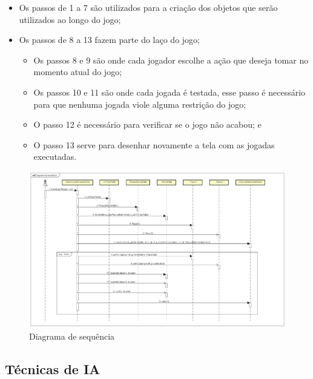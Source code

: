 \begin{itemize}
	\item Os passos de 1 a 7 são utilizados para a criação dos objetos que serão utilizados ao longo do jogo;
	\item Os passos de 8 a 13 fazem parte do laço do jogo;
	\begin{itemize}
		\item Os passos 8 e 9 são onde cada jogador escolhe a ação que deseja tomar no momento atual do jogo;
		\item Os passos 10 e 11 são onde cada jogada é testada, esse passo é necessário para que nenhuma jogada viole alguma restrição do jogo; 
		\item O passo 12 é necessário para verificar se o jogo não acabou; e
		\item O passo 13 serve para desenhar novamente a tela com as jogadas executadas.
	\end{itemize}
\end{itemize}

\begin{figure}[ht]
	\centering
	\includegraphics[width=1\textwidth]{fig/diagramaSequencia.pdf}
	\caption{Diagrama de sequência}
	\label{fig:sequencia}
\end{figure}

\subsection{Técnicas de IA}

